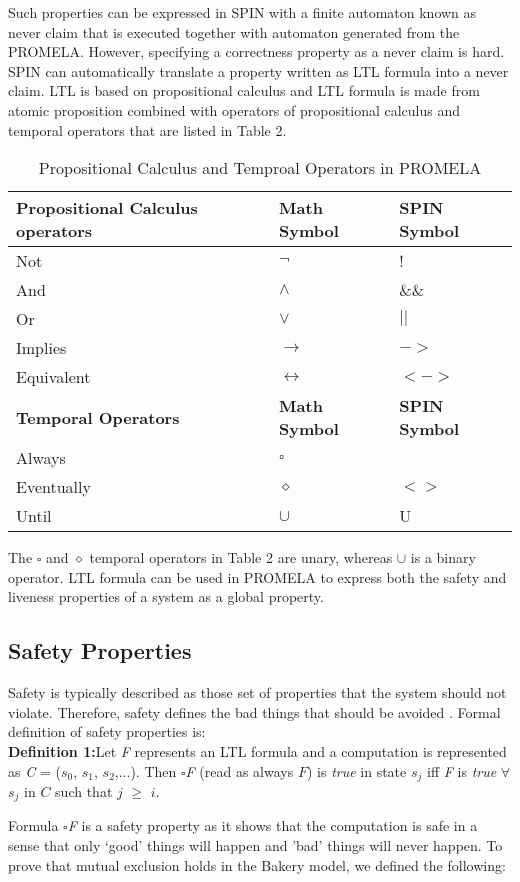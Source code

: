 \documentclass[conference]{IEEEtran}
\begin{document}
Such properties can be expressed in SPIN with a finite automaton known as never claim that is executed together with automaton generated from 
the PROMELA. However, specifying a correctness property as a never claim is hard. SPIN can automatically translate a property written as LTL 
formula into a never claim.  LTL is based on propositional calculus and LTL formula is made from atomic proposition combined with operators of 
propositional calculus and temporal operators that are listed in Table 2.
\begin{table}[!ht]
\caption{Propositional Calculus and Temproal Operators in PROMELA}
\centering
 \begin{tabular}{|>{\centering}p{2.5cm}|>{\centering} p{2cm} |>{\centering} p{2cm} |}
 \hline
\textbf{Propositional Calculus operators} & \textbf{Math Symbol} & \textbf{SPIN Symbol}\tabularnewline
\hline
Not & $\neg$ & !\tabularnewline
And & $\land$ & \&\&\tabularnewline
Or & $\lor$ &$||$\tabularnewline
Implies & $\rightarrow$ & $->$\tabularnewline
Equivalent & $\leftrightarrow$ & $<->$\tabularnewline
\hline
\textbf{Temporal Operators} & \textbf{Math Symbol} & \textbf{SPIN Symbol}\tabularnewline
\hline
Always & $\square$ & [ ]\tabularnewline
Eventually & $\diamond$ & $<>$\tabularnewline
Until & $\cup$ & U\tabularnewline
\hline
\end{tabular}    
\end{table}

The $\square$ and $\diamond$  temporal operators in Table 2 are unary, whereas $\cup$ is a binary operator. 
LTL formula can be used in PROMELA to express both the safety and liveness properties of a system as a global property. 

\subsection{Safety Properties}
Safety is typically described as those set of properties that the system should not violate. Therefore, 
safety defines the bad things that should be avoided \cite{17}. Formal definition of safety properties is: \\
\textbf{Definition 1:}Let \emph{F} represents an LTL formula and a computation is represented as \emph{C} 
= ($s_0$, $s_1$, $s_2$,...). Then $\square$\emph{F} (read as always $F$) is \emph{true} in state $s_j$ iff \emph{F} is \emph{true} $\forall$ 
$s_j$ in $C$ such that $j$ $\geq$ $i$.

Formula $\square$\emph{F} is a safety property as it shows that the computation is safe in a sense that only ‘good’ things will happen and 'bad' 
things will never happen. To prove that mutual exclusion holds in the Bakery model, we defined the following:  
\end{document}
